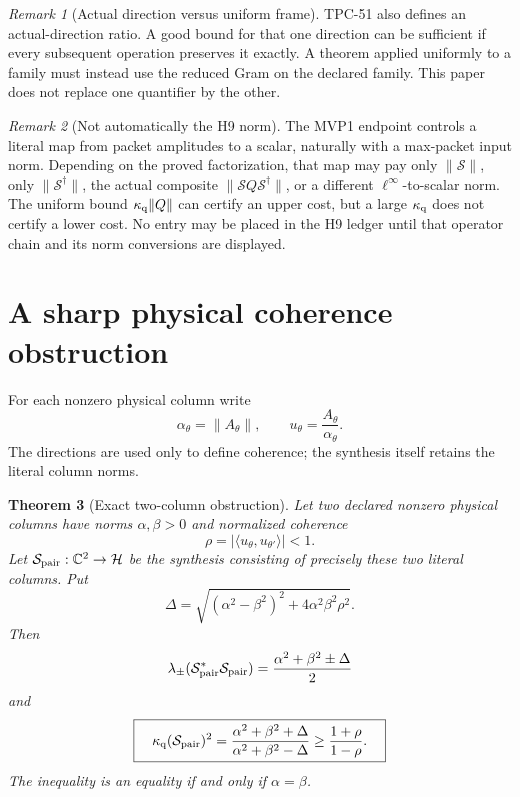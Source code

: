 \documentclass[11pt]{article}
\newtheorem{theorem}{Theorem}[section]
\theoremstyle{definition}
\theoremstyle{remark}
\newtheorem{remark}[theorem]{Remark}
\newcommand{\C}{\mathbb C}
\newcommand{\Syn}{\mathcal S}
\begin{document}
\begin{remark}[Actual direction versus uniform frame]
TPC-51 also defines an actual-direction ratio.  A good bound for that
one direction can be sufficient if every subsequent operation
preserves it exactly.  A theorem applied uniformly to a family must
instead use the reduced Gram on the declared family.  This paper does
not replace one quantifier by the other.
\end{remark}

\begin{remark}[Not automatically the H9 norm]
The MVP1 endpoint controls a literal map from packet amplitudes to a
scalar, naturally with a max-packet input norm.  Depending on the
proved factorization, that map may pay only \(\|\Syn\|\), only
\(\|\Syn^\dagger\|\), the actual composite
\(\|\Syn Q\Syn^\dagger\|\), or a different
\(\ell^\infty\)-to-scalar norm.  The uniform bound
\(\kappa_{\rm q}\|Q\|\) can certify an upper cost, but a large
\(\kappa_{\rm q}\) does not certify a lower cost.  No entry may be
placed in the H9 ledger until that operator chain and its norm
conversions are displayed.
\end{remark}

\section{A sharp physical coherence obstruction}

For each nonzero physical column write
\[
 \alpha_\theta=\|A_\theta\|,\qquad
 u_\theta=\frac{A_\theta}{\alpha_\theta}.
\]
The directions are used only to define coherence; the synthesis
itself retains the literal column norms.

\begin{theorem}[Exact two-column obstruction]
\label{thm:coherence}
Let two declared nonzero physical columns have norms
\(\alpha,\beta>0\) and normalized coherence
\[
 \rho=|\langle u_\theta,u_{\theta'}\rangle|<1.
\]
Let \(\Syn_{\rm pair}:\C^2\to\mathcal H\) be the synthesis consisting
of precisely these two literal columns.  Put
\[
 \Delta=\sqrt{(\alpha^2-\beta^2)^2
                 +4\alpha^2\beta^2\rho^2}.
\]
Then
\[
 \lambda_\pm(\Syn_{\rm pair}^*\Syn_{\rm pair})
 =\frac{\alpha^2+\beta^2\pm\Delta}{2}
\]
and
\[
 \boxed{\quad
 \kappa_{\rm q}(\Syn_{\rm pair})^2
 =\frac{\alpha^2+\beta^2+\Delta}
        {\alpha^2+\beta^2-\Delta}
 \ge\frac{1+\rho}{1-\rho}.
 \quad}
\]
The inequality is an equality if and only if \(\alpha=\beta\).
\end{theorem}
\end{document}
